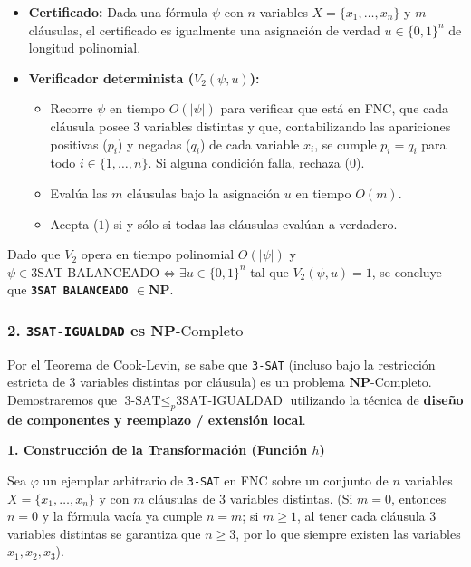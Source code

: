 \begin{itemize}[leftmargin=*]
    \item \textbf{Certificado:} Dada una fórmula $\psi$ con $n$ variables $X = \{x_1, \dots, x_n\}$ y $m$ cláusulas, el certificado es igualmente una asignación de verdad $u \in \{0, 1\}^n$ de longitud polinomial.

    \item \textbf{Verificador determinista ($V_2(\psi, u)$):}
    \begin{itemize}[leftmargin=*]
        \item Recorre $\psi$ en tiempo $O(|\psi|)$ para verificar que está en FNC, que cada cláusula posee $3$ variables distintas y que, contabilizando las apariciones positivas ($p_i$) y negadas ($q_i$) de cada variable $x_i$, se cumple $p_i = q_i$ para todo $i \in \{1, \dots, n\}$. Si alguna condición falla, rechaza ($0$).
        \item Evalúa las $m$ cláusulas bajo la asignación $u$ en tiempo $O(m)$.
        \item Acepta ($1$) si y sólo si todas las cláusulas evalúan a verdadero.
    \end{itemize}
\end{itemize}

Dado que $V_2$ opera en tiempo polinomial $O(|\psi|)$ y $\psi \in \text{3SAT BALANCEADO} \iff \exists u \in \{0, 1\}^n$ tal que $V_2(\psi, u) = 1$, se concluye que \textbf{\texttt{3SAT BALANCEADO} $\in \mathbf{NP}$}.

\subsubsection*{2. \texttt{3SAT-IGUALDAD} es $\mathbf{NP}\text{-Completo}$}

Por el Teorema de Cook-Levin, se sabe que \texttt{3-SAT} (incluso bajo la restricción estricta de $3$ variables distintas por cláusula) es un problema $\mathbf{NP}\text{-Completo}$. Demostraremos que $\text{3-SAT} \le_p \text{3SAT-IGUALDAD}$ utilizando la técnica de \textbf{diseño de componentes y reemplazo / extensión local}.

\vspace{0.3cm}
\noindent\textbf{1. Construcción de la Transformación (Función $h$)}

Sea $\varphi$ un ejemplar arbitrario de \texttt{3-SAT} en FNC sobre un conjunto de $n$ variables $X = \{x_1, \dots, x_n\}$ y con $m$ cláusulas de $3$ variables distintas. (Si $m = 0$, entonces $n = 0$ y la fórmula vacía ya cumple $n = m$; si $m \ge 1$, al tener cada cláusula $3$ variables distintas se garantiza que $n \ge 3$, por lo que siempre existen las variables $x_1, x_2, x_3$).

